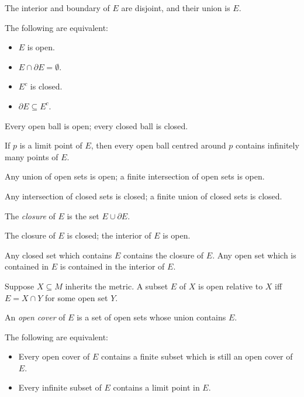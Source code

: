 \begin{prop}
  The interior and boundary of $E$ are disjoint, and their union is $E$.
\end{prop}
\begin{prop}
  The following are equivalent:
  \begin{itemize}
    \item $E$ is open.
    \item $E\cap\partial E=\emptyset$.
    \item $E^c$ is closed.
    \item $\partial E\subseteq E^c$.
  \end{itemize}
\end{prop}
\begin{prop}
  Every open ball is open; every closed ball is closed.
\end{prop}
\begin{prop}
  If $p$ is a limit point of $E$, then every open ball centred around $p$
  contains infinitely many points of $E$.
\end{prop}
\begin{prop}
  Any union of open sets is open; a finite intersection of open sets is open.

  Any intersection of closed sets is closed; a finite union of closed sets is
  closed.
\end{prop}
\begin{defn}
  The \emph{closure} of $E$ is the set $E\cup\partial E$.
\end{defn}
\begin{prop}
  The closure of $E$ is closed; the interior of $E$ is open.

  Any closed set which contains $E$ contains the closure of $E$. Any open set
  which is contained in $E$ is contained in the interior of $E$.
\end{prop}
\begin{prop}
  Suppose $X\subseteq M$ inherits the metric. A subset $E$ of $X$ is open
  relative to $X$ iff $E=X\cap Y$ for some open set $Y$.
\end{prop}
\begin{defn}
  An \emph{open cover} of $E$ is a set of open sets whose union contains $E$.
\end{defn}
\begin{prop}
  The following are equivalent:
  \begin{itemize}
    \item 
      Every open cover of $E$ contains a finite
      subset which is still an open cover of $E$.
    \item Every infinite subset of $E$ contains a limit point in $E$.
  \end{itemize}
\end{prop}
